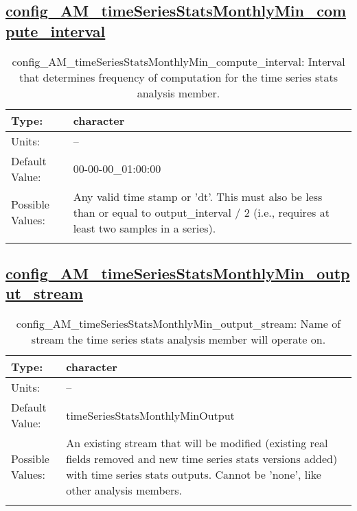 \subsection[config\_AM\_timeSeriesStatsMonthlyMin\_compute\_interval]{\hyperref[sec:nm_tab_AM_timeSeriesStatsMonthlyMin]{config\_AM\_timeSeriesStatsMonthlyMin\_compute\_interval}}
\label{subsec:nm_sec_config_AM_timeSeriesStatsMonthlyMin_compute_interval}
\begin{center}
\begin{longtable}{| p{2.0in} || p{4.0in} |}
    \hline
    Type: & character \\
    \hline
    Units: & -- \\
    \hline
    Default Value: & 00-00-00\_01:00:00 \\
    \hline
    Possible Values: & Any valid time stamp or 'dt'. This must also be less than or equal to output\_interval / 2 (i.e., requires at least two samples in a series). \\
    \hline
    \caption{config\_AM\_timeSeriesStatsMonthlyMin\_compute\_interval: Interval that determines frequency of computation for the time series stats analysis member.}
\end{longtable}
\end{center}
\subsection[config\_AM\_timeSeriesStatsMonthlyMin\_output\_stream]{\hyperref[sec:nm_tab_AM_timeSeriesStatsMonthlyMin]{config\_AM\_timeSeriesStatsMonthlyMin\_output\_stream}}
\label{subsec:nm_sec_config_AM_timeSeriesStatsMonthlyMin_output_stream}
\begin{center}
\begin{longtable}{| p{2.0in} || p{4.0in} |}
    \hline
    Type: & character \\
    \hline
    Units: & -- \\
    \hline
    Default Value: & timeSeriesStatsMonthlyMinOutput \\
    \hline
    Possible Values: & An existing stream that will be modified (existing real fields removed and new time series stats versions added) with time series stats outputs. Cannot be 'none', like other analysis members. \\
    \hline
    \caption{config\_AM\_timeSeriesStatsMonthlyMin\_output\_stream: Name of stream the time series stats analysis member will operate on.}
\end{longtable}
\end{center}
